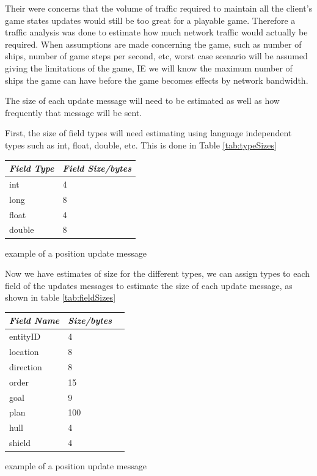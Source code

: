 Their were concerns that the volume of traffic required to maintain all the client's game states updates would still be too great for a playable game.
Therefore a traffic analysis was done to estimate how much network traffic would actually be required.
When assumptions are made concerning the game, such as number of ships, number of game steps per second, etc, worst case scenario will be assumed giving the limitations of the game, IE we will know the maximum number of ships the game can have before the game becomes effects by network bandwidth.



The size of each update message will need to be estimated as well as how frequently that message will be sent.

First, the size of field types will need estimating using language independent types such as int, float, double, etc.
This is done in Table \ref{tab:typeSizes}
\begin{margintable}
    \begin{tabular}{p{5em} p{5em}}
    \toprule
    \emph{Field Type} & \emph{Field Size/bytes} \\
    \midrule
    int & 4 \\ 
    long & 8 \\ 
    float & 4 \\
    double & 8 \\    
    \bottomrule
    \end{tabular}
    	\vspace{1em}
	\caption{example of a position update message}
	\label{tab:typeSizes}
\end{margintable}

Now we have estimates of size for the different types, we can assign types to each field of the updates messages to estimate the size of each update message, as shown in table \ref{tab:fieldSizes}

\begin{margintable}
    \begin{tabular}{p{5em} p{5em} p{5em}}
    \toprule
    \emph{Field Name} & \emph{Size/bytes} \\
    \midrule
    entityID & 4 \\ 
    location & 8 \\
    direction & 8 \\ 
    order & 15 \\
    goal & 9 \\ 
    plan & 100 \\ 
    hull & 4  \\ 
    shield & 4  \\  
    \bottomrule
    \end{tabular}
    	\vspace{1em}
	\caption{example of a position update message}
	\label{tab:fieldSizes}
\end{margintable}

